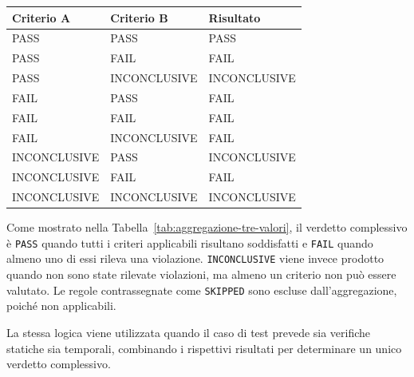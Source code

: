 \begin{center}
\begin{minipage}{0.88\textwidth}
\centering
\begingroup
\small
\renewcommand{\arraystretch}{1.18}
\begin{tabularx}{\linewidth}{|>{\centering\arraybackslash}X|>{\centering\arraybackslash}X|>{\centering\arraybackslash}X|}
\hline
\rowcolor{blue!7}
\textbf{Criterio A} & \textbf{Criterio B} & \textbf{Risultato} \\
\hline
PASS & PASS & PASS \\
\hline
PASS & FAIL & FAIL \\
\hline
PASS & INCONCLUSIVE & INCONCLUSIVE \\
\hline
FAIL & PASS & FAIL \\
\hline
FAIL & FAIL & FAIL \\
\hline
FAIL & INCONCLUSIVE & FAIL \\
\hline
INCONCLUSIVE & PASS & INCONCLUSIVE \\
\hline
INCONCLUSIVE & FAIL & FAIL \\
\hline
INCONCLUSIVE & INCONCLUSIVE & INCONCLUSIVE \\
\hline
\end{tabularx}
\endgroup
{}
\label{tab:aggregazione-tre-valori}
\end{minipage}
\end{center}

Come mostrato nella Tabella~\ref{tab:aggregazione-tre-valori}, il verdetto complessivo è \texttt{PASS} quando tutti i criteri applicabili risultano soddisfatti e \texttt{FAIL} quando almeno uno di essi rileva una violazione. \texttt{INCONCLUSIVE} viene invece prodotto quando non sono state rilevate violazioni, ma almeno un criterio non può essere valutato. Le regole contrassegnate come \texttt{SKIPPED} sono escluse dall'aggregazione, poiché non applicabili.

La stessa logica viene utilizzata quando il caso di test prevede sia verifiche statiche sia temporali, combinando i rispettivi risultati per determinare un unico verdetto complessivo.


